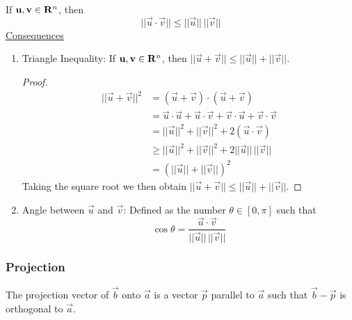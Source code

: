 \documentclass{article}
\begin{document}
	If $ \mathbf{u}, \mathbf{v} \in \mathbf{R}^n $, then
	\[
		|| \vec{u} \cdot \vec{v} || \leq || \vec{u} || \, || \vec{v}||
	\]
	\underline{Consequences}
	\begin{enumerate}[label=\arabic*.)]
		\item Triangle Inequality: If $ \mathbf{u},\mathbf{v} \in \mathbf{R}^n $, then $ || \vec{u} + \vec{v} || \leq ||\vec{u}|| + ||\vec{v}|| $.
		\begin{center}
		\end{center}
		\begin{proof}
			\begin{align*}
				|| \vec{u} + \vec{v} ||^2 &= (\vec{u} + \vec{v}) \cdot (\vec{u} + \vec{v}) \\
				&= \vec{u} \cdot \vec{u} + \vec{u} \cdot \vec{v} + \vec{v} \cdot \vec{u} + \vec{v} \cdot \vec{v} \\
				&= || \vec{u} ||^2 + ||\vec{v}||^2 + 2(\vec{u} \cdot \vec{v}) \\
				&\geq ||\vec{u}||^2 + ||\vec{v}||^2 + 2||\vec{u}|| \, ||\vec{v}|| \\
				&= (||\vec{u}|| + ||\vec{v}||)^2
			\end{align*}
			Taking the square root we then obtain $ || \vec{u} + \vec{v} || \leq ||\vec{u}|| + ||\vec{v}|| $.
		\end{proof}
		\item Angle between $ \vec{u} $ and $ \vec{v} $: Defined as the number $ \theta \in [0,\pi] $ such that 
			\[
				\cos\theta = \frac{\vec{u} \cdot \vec{v}}{||\vec{u}|| \, ||\vec{v}||}
			\]
	\end{enumerate}

	\subsubsection*{Projection}
	
	The projection vector of $ \vec{b} $ onto $ \vec{a} $ is a vector $ \vec{p} $ parallel to $ \vec{a} $ such that $ \vec{b} - \vec{p} $ is orthogonal to $ \vec{a} $.
	
\end{document}
